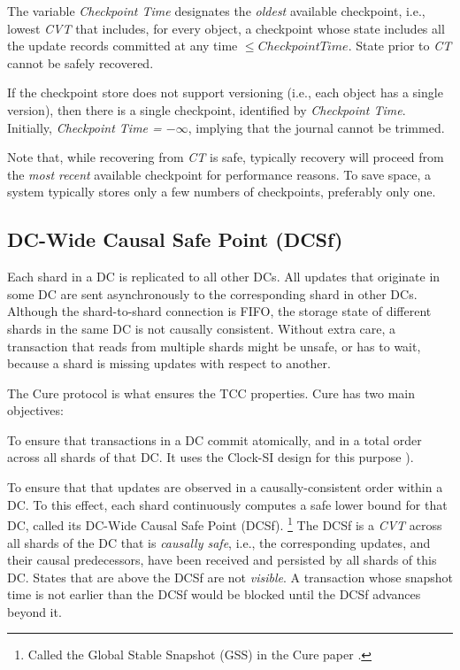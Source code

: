 \documentclass[11pt]{article}
\begin{document}
The variable \emph{Checkpoint Time} designates the \emph{oldest} available
checkpoint, i.e., lowest \emph{CVT} that includes, for every object, a
checkpoint whose state includes all the update records committed at any time
$\le \mathit{Checkpoint Time}$.
State prior to \emph{CT} cannot be safely recovered.

If the checkpoint store does not support versioning (i.e., each object
has a single version), then there is a single checkpoint, identified by
\emph{Checkpoint Time}.
Initially, \emph{Checkpoint Time = $-\infty$}, implying that the journal
cannot be trimmed.

Note that, while recovering from \emph{CT} is safe, typically recovery will
proceed from the \emph{most recent} available checkpoint for performance
reasons.
To save space, a system typically stores only a few numbers of checkpoints,
preferably only one. 


\subsection{DC-Wide Causal Safe Point (DCSf)}
\label{sec:dcsf}
Each shard in a DC is replicated to all other DCs.
All updates that originate in some DC are sent asynchronously to the
corresponding shard in other DCs.
Although the shard-to-shard connection is FIFO, the storage state of
different shards in the same DC is not causally consistent.
Without extra care, a transaction that reads from multiple shards might
be unsafe, or has to wait, because a shard is missing updates with
respect to another.

The Cure protocol \cite{rep:pro:sh182} is what ensures the TCC properties.
Cure has two main objectives:
\begin{compactenum}[(1)]
\item 
  To ensure that transactions in a DC commit atomically, and in a
  total order across all shards of that DC\@.
  It uses the Clock-SI design for this purpose
  \cite{rep:pan:1723}).
\item
  To ensure that that updates are observed in a causally-consistent
  order within a DC\@.
  To this effect, each shard continuously computes a safe lower bound
  for that DC, called its DC-Wide Causal Safe Point (DCSf).%
\footnote{
  Called the Global Stable Snapshot (GSS) in the Cure paper
  \cite{rep:pro:sh182}.
}
  The DCSf is a \emph{CVT} across all shards of the DC that is
  \emph{causally safe}, i.e., the corresponding updates, and their causal
  predecessors, have been received and persisted by all shards of this DC.
  States that are above the DCSf are not \emph{visible}.
  A transaction whose snapshot time is not earlier than the DCSf would
  be blocked until the DCSf advances beyond it.
\end{compactenum}
\end{document}
